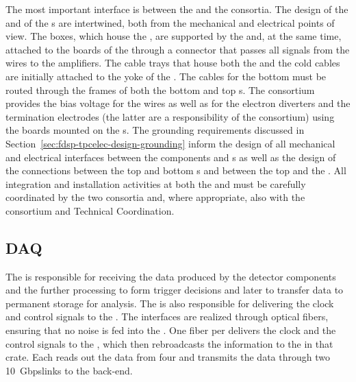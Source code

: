 The most important interface is between the 
and the  consortia. The design of the 
and of the s are intertwined, both from the
mechanical and electrical points of view. The 
boxes, which house the , are supported by the 
and, at the same time, attached to the  boards of the 
through a connector that passes all signals from the wires to
the  amplifiers. The cable trays that house both the
 and the  cold cables are initially
attached to the yoke of the . The 
cables for the bottom  must be routed through the 
frames of both the bottom and top s. The 
consortium provides the bias voltage for the 
wires as well as for the electron diverters and the  termination electrodes (the latter are a responsibility of
the  consortium) using the  boards mounted
on the s. The grounding requirements discussed in
Section~\ref{sec:fdsp-tpcelec-design-grounding} inform the
design of all mechanical and electrical interfaces between
the  components and s as well as the
design of the connections between the top and bottom s
and between the top  and the . All 
integration and installation activities at both
the  and  must be carefully coordinated by
the two consortia and, where appropriate, also with the 
consortium and Technical Coordination.

\subsection{DAQ}
\label{sec:fdsp-tpcelec-interfaces-daq}

The  is responsible for receiving the data produced by the
 detector components and the further processing to
form trigger decisions and later to transfer data to 
permanent storage for analysis. The 
 is also responsible for delivering the clock and control
signals to the . The interfaces are realized 
through optical fibers, ensuring that no noise is fed into
the . One fiber per  delivers the
clock and the control signals to the , which then
rebroadcasts the information to the  in that 
crate. Each  reads out the data from four 
and transmits the data through two \SI{10}{Gbps}links to the  back-end.


